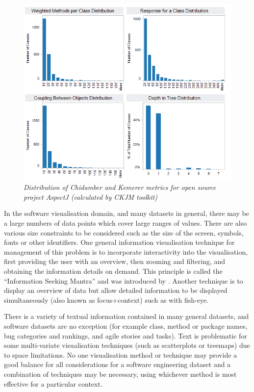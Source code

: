 \begin{figure}[!htb]
   	\centering
  	\includegraphics[scale=0.70]{distributions.png}	
	\caption{\textit{Distribution of Chidamber and Kemerer metrics for open source project AspectJ (calculated by CKJM toolkit)}}
	\label{fig:distributions}
\end{figure}

In the software visualisation domain, and many datasets in general, there may be a large numbers of data points which cover large ranges of values. There are also various size constraints to be considered such as the size of the screen, symbols, fonts or other identifiers. One general information visualisation technique for management of this problem is to incorporate interactivity into the visualisation, first providing the user with an overview, then zooming and filtering, and obtaining the information details on demand. This principle is called the ``Information Seeking Mantra'' and was introduced by \citet{schneiderman96}. Another technique is to display an overview of data but allow detailed information to be displayed simultaneously (also known as focus+context) such as with fish-eye. 

There is a variety of textual information contained in many general datasets, and software datasets are no exception (for example class, method or package names, bug categories and rankings, and agile stories and tasks). Text is problematic for some multi-variate visualisation techniques (such as scatterplots or treemaps) due to space limitations. No one visualisation method or technique may provide a good balance for all considerations for a software engineering dataset and a combination of techniques may be necessary, using whichever method is most effective for a particular context.

